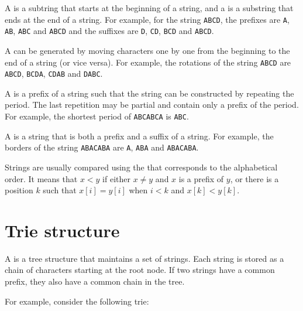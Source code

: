 
A  is a subtring that starts at the beginning
of a string,
and a  is a substring that ends at the end
of a string.
For example, for the string \texttt{ABCD},
the prefixes are
\texttt{A}, \texttt{AB}, \texttt{ABC} and \texttt{ABCD}
and the suffixes are
\texttt{D}, \texttt{CD}, \texttt{BCD} and \texttt{ABCD}.


A  can be generated by moving
characters one by one from the beginning
to the end of a string (or vice versa).
For example, the rotations of the string
\texttt{ABCD} are
\texttt{ABCD}, \texttt{BCDA}, \texttt{CDAB} and \texttt{DABC}.


A  is a prefix of a string such that
the string can be constructed by repeating the period.
The last repetition may be partial and contain
only a prefix of the period.
For example, the shortest period of
\texttt{ABCABCA} is \texttt{ABC}.


A  is a string that is both
a prefix and a suffix of a string.
For example, the borders of the string \texttt{ABACABA}
are \texttt{A}, \texttt{ABA} and \texttt{ABACABA}.


Strings are usually compared using the 
that corresponds to the alphabetical order.
It means that $x<y$ if either $x \neq y$ and $x$ is a prefix of $y$,
or there is a position $k$ such that
$x[i]=y[i]$ when $i<k$ and $x[k]<y[k]$.

\section{Trie structure}


A  is a tree structure that
maintains a set of strings.
Each string is stored as
a chain of characters starting at
the root node.
If two strings have a common prefix,
they also have a common chain in the tree.

For example, consider the following trie:

